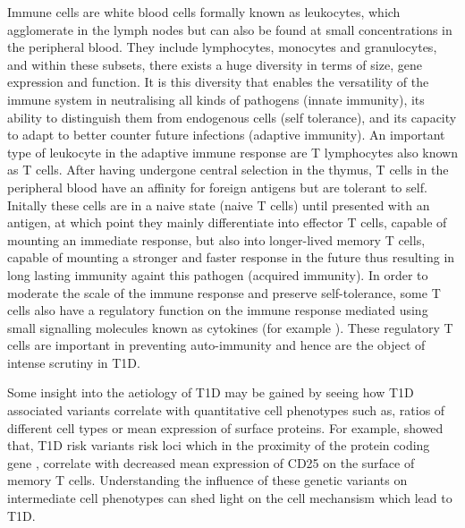 Immune cells are white blood cells formally known as leukocytes, which agglomerate in the lymph nodes but can also be found at small concentrations in the peripheral blood.
They include lymphocytes, monocytes and granulocytes, and within these subsets, there exists a huge diversity in terms of size, gene expression and function.
It is this diversity that enables the versatility of the immune system in neutralising all kinds of pathogens (innate immunity),
its ability to distinguish them from endogenous cells (self tolerance),
and its capacity to adapt to better counter future infections (adaptive immunity).
An important type of leukocyte in the adaptive immune response are T lymphocytes also known as T cells.
After having undergone central selection in the thymus,
T cells in the peripheral blood have an affinity for foreign antigens but are tolerant to self.
Initally these cells are in a naive state (naive T cells) until presented with an antigen,
at which point they mainly differentiate into effector T cells, capable of mounting an immediate response,
but also into longer-lived memory T cells, capable of mounting a stronger and faster response in the future thus
resulting in long lasting immunity againt this pathogen (acquired immunity).
In order to moderate the scale of the immune response and preserve self-tolerance, some T cells also have a regulatory function on the immune response
mediated using small signalling molecules known as cytokines (for example ).
These regulatory T cells are important in preventing auto-immunity and hence are the object of intense scrutiny in T1D.

Some insight into the aetiology of T1D may be gained by seeing how T1D associated variants correlate with quantitative cell phenotypes such as, 
ratios of different cell types or mean expression of surface proteins.
For example, \citet{Dendrou:2009dv} showed that, T1D risk variants risk loci which in the proximity of the protein coding gene ,
correlate with decreased mean expression of CD25 on the surface of memory T cells.
Understanding the influence of these genetic variants on intermediate cell phenotypes can shed light on the cell mechansism which lead to T1D.


